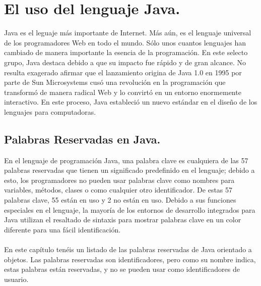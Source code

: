 \section{El uso del lenguaje Java.}
Java es el leguaje más importante de Internet. Más aún, es el lenguaje universal de los programadores Web en todo el mundo. Sólo unos cuantos lenguajes han cambiado de manera importante la esencia de la programación. En este selecto grupo, Java destaca debido a que su impacto fue rápido y de gran alcance. No resulta exagerado afirmar que el lanzamiento origina de Java 1.0 en 1995 por parte de Sun Microsystems cusó una revolución en la programación que transformó de manera radical Web y lo convirtó en un entorno enormemente interactivo. En este proceso, Java estableció un nuevo estándar en el diseño de los lenguajes para computadoras. \\ 

\subsection{Palabras Reservadas en Java.}
En el lenguaje de programación Java, una palabra clave es cualquiera de las 57 palabras reservadas que tienen un significado predefinido en el lenguaje; debido a esto, los programadores no pueden usar palabras clave como nombres para variables, métodos, clases o como cualquier otro identificador. De estas 57 palabras clave, 55 están en uso y 2 no están en uso. Debido a sus funciones especiales en el lenguaje, la mayoría de los entornos de desarrollo integrados para Java utilizan el resaltado de sintaxis para mostrar palabras clave en un color diferente para una fácil identificación.\\
\\
En este capítulo tenéis un listado de las palabras reservadas de Java orientado a objetos. Las palabras reservadas son identificadores, pero como su nombre indica, estas palabras están reservadas, y no se pueden usar como identificadores de usuario.
 
